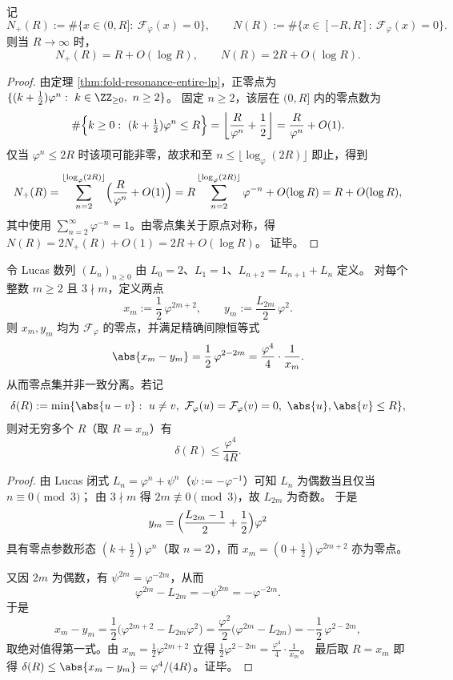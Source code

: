 \begin{corollary}[零点计数的线性律与显式余项阶]\label{cor:fold-resonance-zero-counting-linear}
记
\[
N_+(R):=\#\{x\in(0,R]:\ \mathcal{F}_\varphi(x)=0\},
\qquad
N(R):=\#\{x\in[-R,R]:\ \mathcal{F}_\varphi(x)=0\}.
\]
则当 \(R\to\infty\) 时，
\[
N_+(R)=R+O(\log R),
\qquad
N(R)=2R+O(\log R).
\]
\end{corollary}

\begin{proof}
由定理 \ref{thm:fold-resonance-entire-lp}，正零点为 \(\{(k+\tfrac12)\varphi^n:\ k\in\ZZ_{\ge 0},\ n\ge 2\}\)。
固定 \(n\ge 2\)，该层在 \((0,R]\) 内的零点数为
\[
\#\Bigl\{k\ge 0:\ (k+\tfrac12)\varphi^n\le R\Bigr\}
=\left\lfloor \frac{R}{\varphi^n}+\frac12\right\rfloor
=\frac{R}{\varphi^n}+O(1).
\]
仅当 \(\varphi^n\le 2R\) 时该项可能非零，故求和至 \(n\le \lfloor\log_\varphi(2R)\rfloor\) 即止，得到
\[
N_+(R)
=\sum_{n=2}^{\lfloor\log_\varphi(2R)\rfloor}\Bigl(\frac{R}{\varphi^n}+O(1)\Bigr)
=R\sum_{n=2}^{\lfloor\log_\varphi(2R)\rfloor}\varphi^{-n}+O(\log R)
=R+O(\log R),
\]
其中使用 \(\sum_{n=2}^{\infty}\varphi^{-n}=1\)。由零点集关于原点对称，得
\(
N(R)=2N_+(R)+O(1)=2R+O(\log R)
\)。
证毕。
\end{proof}

\begin{theorem}\label{thm:fold-resonance-lucas-near-resonance-gap}
令 Lucas 数列 \((L_n)_{n\ge 0}\) 由 \(L_0=2\)、\(L_1=1\)、\(L_{n+2}=L_{n+1}+L_n\) 定义。
对每个整数 \(m\ge 2\) 且 \(3\nmid m\)，定义两点
\[
x_m:=\frac12\,\varphi^{2m+2},
\qquad
y_m:=\frac{L_{2m}}{2}\,\varphi^2.
\]
则 \(x_m,y_m\) 均为 \(\mathcal{F}_\varphi\) 的零点，并满足精确间隙恒等式
\[
\abs{x_m-y_m}
=\frac12\,\varphi^{2-2m}
=\frac{\varphi^4}{4}\cdot\frac{1}{x_m}.
\]
从而零点集并非一致分离。若记
\[
\delta(R):=\min\{\abs{u-v}:\ u\ne v,\ \mathcal{F}_\varphi(u)=\mathcal{F}_\varphi(v)=0,\ \abs{u},\abs{v}\le R\},
\]
则对无穷多个 \(R\)（取 \(R=x_m\)）有
\[
\delta(R)\le \frac{\varphi^4}{4R}.
\]
\end{theorem}

\begin{proof}
由 Lucas 闭式 \(L_n=\varphi^n+\psi^n\)（\(\psi:=-\varphi^{-1}\)）可知 \(L_n\) 为偶数当且仅当 \(n\equiv 0\pmod 3\)；
由 \(3\nmid m\) 得 \(2m\not\equiv 0\pmod 3\)，故 \(L_{2m}\) 为奇数。
于是
\[
y_m=\Bigl(\frac{L_{2m}-1}{2}+\frac12\Bigr)\varphi^2
\]
具有零点参数形态 \((k+\tfrac12)\varphi^n\)（取 \(n=2\)），而 \(x_m=(0+\tfrac12)\varphi^{2m+2}\) 亦为零点。

又因 \(2m\) 为偶数，有 \(\psi^{2m}=\varphi^{-2m}\)，从而
\[
\varphi^{2m}-L_{2m}
=-\psi^{2m}
=-\varphi^{-2m}.
\]
于是
\[
x_m-y_m
=\frac12\bigl(\varphi^{2m+2}-L_{2m}\varphi^2\bigr)
=\frac{\varphi^2}{2}\bigl(\varphi^{2m}-L_{2m}\bigr)
=-\frac12\,\varphi^{2-2m},
\]
取绝对值得第一式。由 \(x_m=\frac12\varphi^{2m+2}\) 立得
\(\frac12\varphi^{2-2m}=\frac{\varphi^4}{4}\cdot \frac{1}{x_m}\)。
最后取 \(R=x_m\) 即得 \(\delta(R)\le \abs{x_m-y_m}=\varphi^4/(4R)\)。证毕。
\end{proof}

